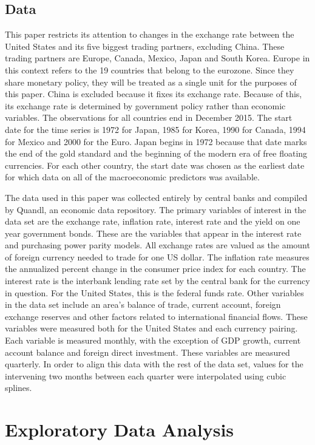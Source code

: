 \documentclass{sig-alternate-05-2015}
\begin{document}
\subsection{Data}
This paper restricts its attention to changes in the exchange rate between the United States and its five biggest trading partners, excluding China. These trading partners are Europe, Canada, Mexico, Japan and South Korea. Europe in this context refers to the 19 countries that belong to the eurozone. Since they share monetary policy, they will be treated as a single unit for the purposes of this paper. China is excluded because it fixes its exchange rate. Because of this, its exchange rate is determined by government policy rather than economic variables. The observations for all countries end in December 2015. The start date for the time series is 1972 for Japan, 1985 for Korea, 1990 for Canada, 1994 for Mexico and 2000 for the Euro. Japan begins in 1972 because that date marks the end of the gold standard and the beginning of the modern era of free floating currencies. For each other country, the start date was chosen as the earliest date for which data on all of the macroeconomic predictors was available. 
\par{} The data used in this paper was collected entirely by central banks and compiled by Quandl, an economic data repository. The primary variables of interest in the data set are the exchange rate, inflation rate, interest rate and the yield on one year government bonds. These are the variables that appear in the interest rate and purchasing power parity models. All exchange rates are valued as the amount of foreign currency needed to trade for one US dollar. The inflation rate measures the annualized percent change in the consumer price index for each country. The interest rate is the interbank lending rate set by the central bank for the currency in question. For the United States, this is the federal funds rate.  Other variables in the data set include an area's balance of trade, current account, foreign exchange reserves and other factors related to international financial flows. These variables were measured both for the United States and each currency pairing. Each variable is measured monthly, with the exception of GDP growth, current account balance and foreign direct investment. These variables are measured quarterly. In order to align this data with the rest of the data set, values for the intervening two months between each quarter were interpolated using cubic splines.

\section{Exploratory Data Analysis}
\end{document}
